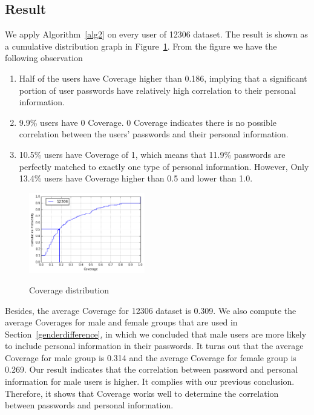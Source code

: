 \documentclass{sig-alternate}
\begin{document}
\subsection{Result}
We apply Algorithm~\ref{alg2} on every user of 12306 dataset. The result is shown as a cumulative distribution graph in Figure~\ref{f2}. From the figure we have the following observation
\begin{enumerate}[leftmargin=*]
\item Half of the users have Coverage higher than 0.186, implying that  a significant portion of user passwords have relatively high correlation to their personal information.
\item 9.9\% users have 0 Coverage. 0 Coverage indicates there is no possible correlation between the users' passwords and their personal information.
\item 10.5\% users have Coverage of 1, which means that 11.9\% passwords are perfectly matched to exactly one type of personal information. However, Only 13.4\% users have Coverage higher than 0.5 and lower than 1.0. 
\end{enumerate}

\begin{figure}[h!]
\centering
  \caption{Coverage distribution}{}
  \label{f2}
  \centering
    \includegraphics[width=0.45\textwidth]{fig/cvghist}
\end{figure}

Besides, the average Coverage for 12306 dataset is 0.309. We also compute the average Coverages for male and female groups that are used in Section~\ref{genderdifference}, in which we concluded that male users are more likely to include personal information in their passwords. It turns out that the average Coverage for male group is 0.314 and the average Coverage for female group is 0.269. Our result indicates that the correlation between password and personal information for male users is higher. It complies with our previous conclusion. Therefore, it shows that Coverage works well to determine the correlation between passwords and personal information.
\end{document}
